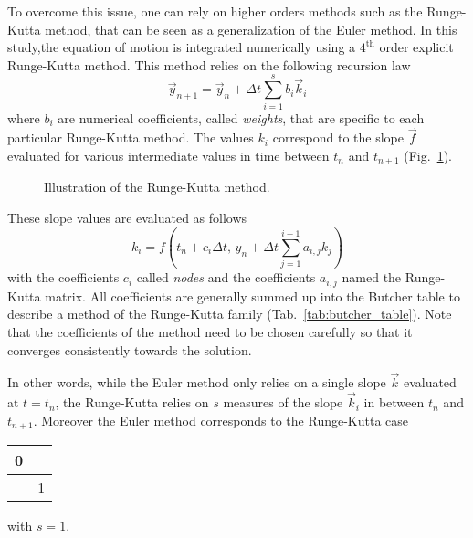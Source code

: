 To overcome this issue, one can rely on higher orders methods such as the Runge-Kutta method, that can be seen as a generalization of the Euler method.
In this study,the equation of motion is integrated numerically using a $4^{\mathrm{th}}$ order explicit Runge-Kutta method.
This method relies on the following recursion law
\begin{equation}
	\vec{y}_{n+1} = \vec{y}_n + \varDelta t \sum_{i = 1}^s b_i \vec{k}_i
\end{equation}
where $b_i$ are numerical coefficients, called \textit{weights}, that are specific to each particular Runge-Kutta method.
The values $k_i$ correspond to the slope $\vec{f}$ evaluated for various intermediate values in time between $t_{n}$ and $t_{n+1}$ (Fig.~\ref{fig:runge_kutta}).
\begin{figure}
	\centering
	\def\svgwidth{0.6\textwidth}
	
  	\caption{
  		Illustration of the Runge-Kutta method.
  	}
  	\label{fig:runge_kutta}
\end{figure}
These slope values are evaluated as follows
\begin{equation}
	k_i = f(t_n + c_i \varDelta t, \, y_n + \varDelta t \sum_{j=1}^{i-1} a_{i,j} k_j)
\end{equation}
with the coefficients $c_i$ called \textit{nodes} and the coefficients $a_{i,j}$ named the Runge-Kutta matrix.
All coefficients are generally summed up into the Butcher table to describe a method of the Runge-Kutta family (Tab.~\ref{tab:butcher_table}).
Note that the coefficients of the method need to be chosen carefully so that it converges consistently towards the solution.

In other words, while the Euler method only relies on a single slope $\vec{k}$ evaluated at $t = t_n$, the Runge-Kutta relies on $s$ measures of the slope $\vec{k}_i$ in between $t_n$ and $t_{n+1}$.
Moreover the Euler method corresponds to the Runge-Kutta case {\normalsize\begin{tabular*}{33pt}{ r | l }
	0 & \\
	\midrule
	 & 1
\end{tabular*}} with $s=1$.

